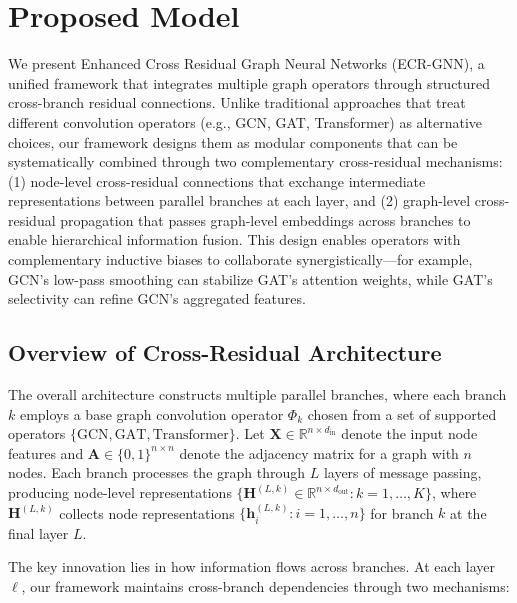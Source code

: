 \section{Proposed Model}
\label{sec:model}

We present Enhanced Cross Residual Graph Neural Networks (ECR-GNN), a unified framework that integrates multiple graph operators through structured cross-branch residual connections. Unlike traditional approaches that treat different convolution operators (e.g., GCN, GAT, Transformer) as alternative choices, our framework designs them as modular components that can be systematically combined through two complementary cross-residual mechanisms: (1) node-level cross-residual connections that exchange intermediate representations between parallel branches at each layer, and (2) graph-level cross-residual propagation that passes graph-level embeddings across branches to enable hierarchical information fusion. This design enables operators with complementary inductive biases to collaborate synergistically—for example, GCN's low-pass smoothing can stabilize GAT's attention weights, while GAT's selectivity can refine GCN's aggregated features.

\subsection{Overview of Cross-Residual Architecture}

The overall architecture constructs multiple parallel branches, where each branch $k$ employs a base graph convolution operator $\Phi_k$ chosen from a set of supported operators $\{\text{GCN}, \text{GAT}, \text{Transformer}\}$. Let $\mathbf{X} \in \mathbb{R}^{n \times d_{\text{in}}}$ denote the input node features and $\mathbf{A} \in \{0,1\}^{n \times n}$ denote the adjacency matrix for a graph with $n$ nodes. Each branch processes the graph through $L$ layers of message passing, producing node-level representations $\{\mathbf{H}^{(L, k)} \in \mathbb{R}^{n \times d_{\text{out}}} : k = 1, \ldots, K\}$, where $\mathbf{H}^{(L, k)}$ collects node representations $\{\mathbf{h}_i^{(L, k)} : i = 1, \ldots, n\}$ for branch $k$ at the final layer $L$.

The key innovation lies in how information flows across branches. At each layer $\ell$, our framework maintains cross-branch dependencies through two mechanisms:

